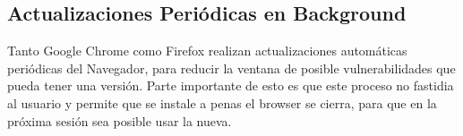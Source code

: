 



 \subsection{Actualizaciones Periódicas en Background}
 Tanto Google Chrome \cite{reis2009browser} como Firefox realizan actualizaciones automáticas periódicas del Navegador, para reducir la ventana de posible vulnerabilidades que pueda tener una versión. Parte importante de esto es que este proceso no fastidia al usuario y permite que se instale a penas el browser se cierra, para que en la próxima sesión sea posible usar la nueva.



%     
%     








